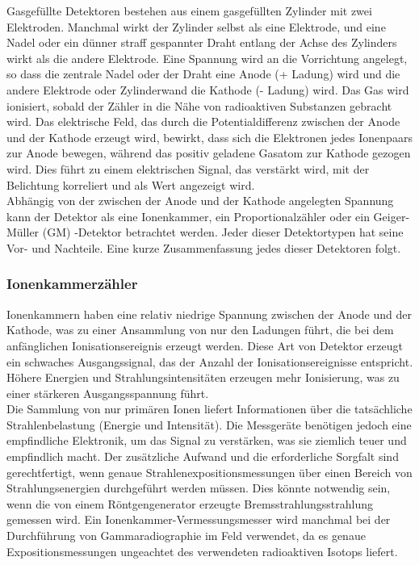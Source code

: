 {Gasgefüllte Detektoren bestehen aus einem gasgefüllten Zylinder mit zwei Elektroden. Manchmal wirkt der Zylinder selbst als eine Elektrode, und eine Nadel oder ein dünner straff gespannter Draht entlang der Achse des Zylinders wirkt als die andere Elektrode. Eine Spannung wird an die Vorrichtung angelegt, so dass die zentrale Nadel oder der Draht eine Anode (+ Ladung) wird und die andere Elektrode oder Zylinderwand die Kathode (- Ladung) wird. Das Gas wird ionisiert, sobald der Zähler in die Nähe von radioaktiven Substanzen gebracht wird. Das elektrische Feld, das durch die Potentialdifferenz zwischen der Anode und der Kathode erzeugt wird, bewirkt, dass sich die Elektronen jedes Ionenpaars zur Anode bewegen, während das positiv geladene Gasatom zur Kathode gezogen wird. Dies führt zu einem elektrischen Signal, das verstärkt wird, mit der Belichtung korreliert und als Wert angezeigt wird.\\
Abhängig von der zwischen der Anode und der Kathode angelegten Spannung kann der Detektor als eine Ionenkammer, ein Proportionalzähler oder ein Geiger-Müller (GM) -Detektor betrachtet werden. Jeder dieser Detektortypen hat seine Vor- und Nachteile. Eine kurze Zusammenfassung jedes dieser Detektoren folgt.
\subsubsection{Ionenkammerzähler}
Ionenkammern haben eine relativ niedrige Spannung zwischen der Anode und der Kathode, was zu einer Ansammlung von nur den Ladungen führt, die bei dem anfänglichen Ionisationsereignis erzeugt werden. Diese Art von Detektor erzeugt ein schwaches Ausgangssignal, das der Anzahl der Ionisationsereignisse entspricht. Höhere Energien und Strahlungsintensitäten erzeugen mehr Ionisierung, was zu einer stärkeren Ausgangsspannung führt.\\
Die Sammlung von nur primären Ionen liefert Informationen über die tatsächliche Strahlenbelastung (Energie und Intensität). Die Messgeräte benötigen jedoch eine empfindliche Elektronik, um das Signal zu verstärken, was sie ziemlich teuer und empfindlich macht. Der zusätzliche Aufwand und die erforderliche Sorgfalt sind gerechtfertigt, wenn genaue Strahlenexpositionsmessungen über einen Bereich von Strahlungsenergien durchgeführt werden müssen. Dies könnte notwendig sein, wenn die von einem Röntgengenerator erzeugte Bremsstrahlungsstrahlung gemessen wird. Ein Ionenkammer-Vermessungsmesser wird manchmal bei der Durchführung von Gammaradiographie im Feld verwendet, da es genaue Expositionsmessungen ungeachtet des verwendeten radioaktiven Isotops liefert.
}
